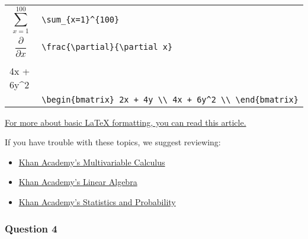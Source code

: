 \documentclass[11pt]{article}
\providecommand{\tightlist}{%
      \setlength{\itemsep}{0pt}\setlength{\parskip}{0pt}}
\begin{document}
\begin{longtable}[]{@{}ll@{}}
\begin{minipage}[t]{0.05\columnwidth}
\[\sum_{x=1}^{100}\]\strut
\end{minipage} & \begin{minipage}[t]{0.05\columnwidth}\raggedright\strut
\texttt{\textbackslash{}sum\_\{x=1\}\^{}\{100\}}\strut
\end{minipage}\tabularnewline
\begin{minipage}[t]{0.05\columnwidth}\raggedright\strut
\[\frac{\partial}{\partial x} \]\strut
\end{minipage} & \begin{minipage}[t]{0.05\columnwidth}\raggedright\strut
\texttt{\textbackslash{}frac\{\textbackslash{}partial\}\{\textbackslash{}partial\ x\}}\strut
\end{minipage}\tabularnewline
\begin{minipage}[t]{0.05\columnwidth}\raggedright\strut
\[\begin{bmatrix} 2x + 4y \\ 4x + 6y^2 \\ \end{bmatrix}\]\strut
\end{minipage} & \begin{minipage}[t]{0.05\columnwidth}\raggedright\strut
\texttt{\textbackslash{}begin\{bmatrix\}\ 2x\ +\ 4y\ \textbackslash{}\textbackslash{}\ 4x\ +\ 6y\^{}2\ \textbackslash{}\textbackslash{}\ \textbackslash{}end\{bmatrix\}}\strut
\end{minipage}\tabularnewline
\bottomrule
\end{longtable}

\href{https://www.sharelatex.com/learn/Mathematical_expressions}{For
more about basic LaTeX formatting, you can read this article.}

If you have trouble with these topics, we suggest reviewing:

\begin{itemize}
\tightlist
\item
  \href{https://www.khanacademy.org/math/multivariable-calculus}{Khan
  Academy's Multivariable Calculus}
\item
  \href{https://www.khanacademy.org/math/linear-algebra}{Khan Academy's
  Linear Algebra}
\item
  \href{https://www.khanacademy.org/math/statistics-probability}{Khan
  Academy's Statistics and Probability}
\end{itemize}

    \subsubsection{Question 4}\label{question-4}
\end{document}
